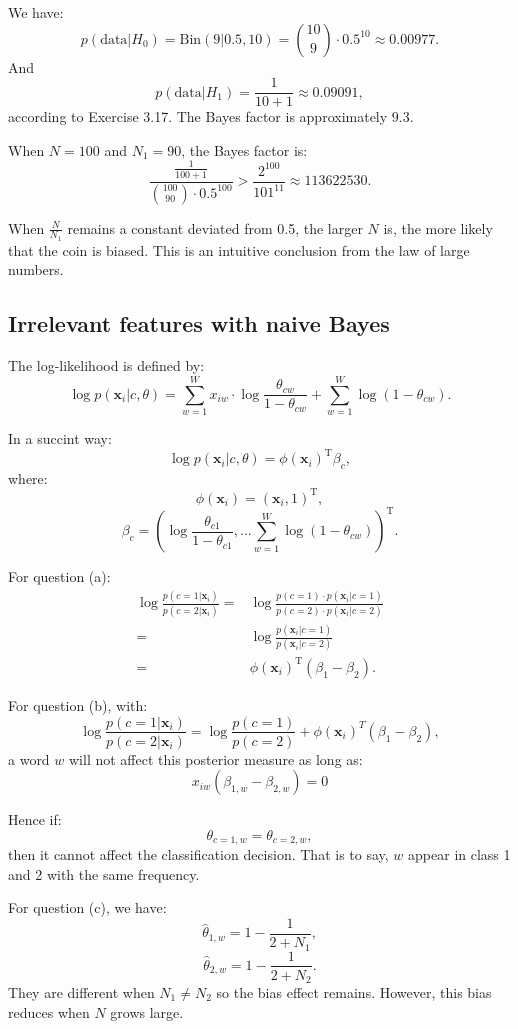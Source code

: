 \documentclass[UTF8]{ctexart}
\begin{document}
We have:
$$p(\text{data}|H_{0})=\text{Bin}(9|0.5,10)=\binom{10}{9}\cdot 0.5^{10}\approx 0.00977.$$
And
$$p(\text{data}|H_{1})=\frac{1}{10+1}\approx 0.09091,$$
according to Exercise 3.17.
The Bayes factor is approximately $9.3$.

When $N=100$ and $N_{1}=90$, the Bayes factor is:
$$\frac{\frac{1}{100+1}}{\binom{100}{90}\cdot 0.5^{100}}>\frac{2^{100}}{101^{11}}\approx 113622530.$$

When $\frac{N}{N_{1}}$ remains a constant deviated from 0.5, the larger $N$ is, the more likely that the coin is biased.
This is an intuitive conclusion from the law of large numbers.


\subsection{Irrelevant features with naive Bayes}
The log-likelihood is defined by:
$$\log p(\textbf{x}_{i}|c,\theta)=\sum_{w=1}^{W}x_{iw}\cdot \log \frac{\theta_{cw}}{1-\theta_{cw}}+\sum_{w=1}^{W}\log (1-\theta_{cw}).$$

In a succint way:
$$\log p(\textbf{x}_{i}|c,\theta)=\phi(\textbf{x}_{i})^{\text{T}} \beta_{c},$$
where:
$$\phi(\textbf{x}_{i})=(\textbf{x}_{i},1)^{\text{T}},$$
$$\beta_{c}=\left(\log \frac{\theta_{c1}}{1-\theta_{c1}},...\sum_{w=1}^{W}\log(1-\theta_{cw})\right)^{\text{T}}.$$

For question (a):
\begin{align}
\log \frac{p(c=1|\textbf{x}_{i})}{p(c=2|\textbf{x}_{i})} =&\log \frac{p(c=1)\cdot p(\textbf{x}_{i}|c=1)}{p(c=2)\cdot p(\textbf{x}_{i}|c=2)} \nonumber \\
=&\log \frac{p(\textbf{x}_{i}|c=1)}{p(\textbf{x}_{i}|c=2)} \nonumber \\
=&\phi(\textbf{x}_{i})^{\text{T}}(\beta_{1}-\beta_{2}). \nonumber
\end{align}

For question (b), with:
$$\log \frac{p(c=1|\textbf{x}_{i})}{p(c=2|\textbf{x}_{i})} = \log \frac{p(c=1)}{p(c=2)} +  \phi(\textbf{x}_{i})^{T}(\beta_{1}-\beta_{2}),$$
a word $w$ will not affect this posterior measure as long as:
$$x_{iw}(\beta_{1,w}-\beta_{2,w})=0$$

Hence if:
$$\theta_{c=1,w}=\theta_{c=2,w},$$
then it cannot affect the classification decision.
That is to say, $w$ appear in class 1 and 2 with the same frequency.

For question (c), we have:
$$\hat{\theta}_{1,w}=1-\frac{1}{2+N_{1}},$$
$$\hat{\theta}_{2,w}=1-\frac{1}{2+N_{2}}.$$
They are different when $N_{1} \neq N_{2}$ so the bias effect remains.
However, this bias reduces when $N$ grows large.
\end{document}
